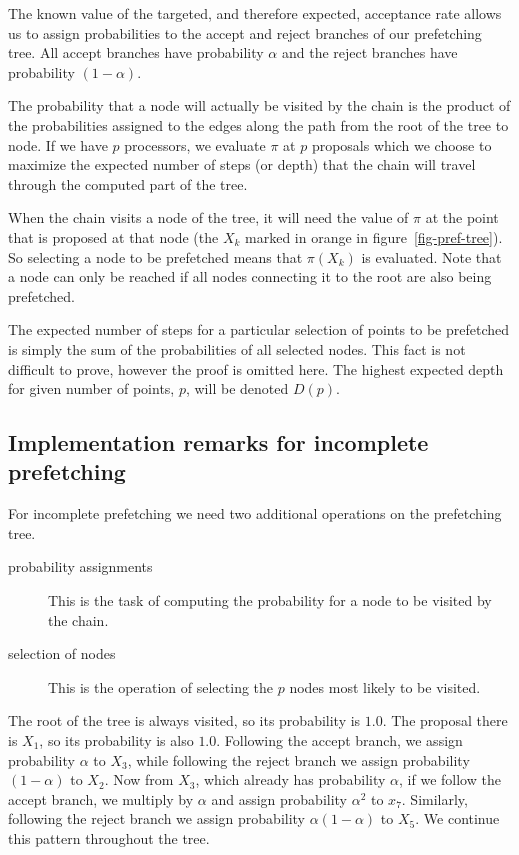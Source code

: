 \documentclass[11pt,letterpaper]{article}       %
\begin{document}
The known value of the targeted, and therefore expected, acceptance rate
allows us to assign probabilities to the accept and reject branches of our
prefetching tree.  All accept branches have probability $\alpha$ and 
the reject branches have probability $(1-\alpha)$.

The probability that a node will actually be visited by 
the chain is the product of the probabilities assigned to the edges along the 
path from the root of the tree to node.  If we have $p$ processors, we  
evaluate $\pi$ at $p$ proposals which we choose to maximize the expected 
number of steps (or depth) that the chain will travel through the computed 
part of the tree.  

When the chain visits a node of the 
tree, it will need the value of $\pi$ at the point that is proposed at that 
node (the $X_k$ marked in orange in figure~\ref{fig-pref-tree}).  So 
selecting a node to be 
prefetched means that $\pi(X_k)$ is evaluated.  
Note that a node can only be reached if all 
nodes connecting it to the root are also being prefetched. 

The expected number of steps for a particular selection of points to be 
prefetched is simply the sum of the probabilities of all selected 
nodes.  This fact is not difficult to prove, however the proof is omitted here. 
The highest expected depth for given number of points, $p$, will be denoted $D(p)$.

\subsection{Implementation remarks for incomplete prefetching}

For incomplete prefetching we need two additional operations on the prefetching 
tree.  
\begin{description}
\item[probability assignments] This is the task of computing the 
probability for a node to be visited by the chain.
\item[selection of nodes] This is the operation of selecting the 
$p$ nodes most likely to be visited.
\end{description}

The root of the tree is always visited, so its probability is $1.0$.  The 
proposal there is $X_1$, so its probability is also $1.0$.  Following the 
accept branch, we assign probability $\alpha$ to $X_3$, while following 
the reject branch we assign probability $(1-\alpha)$ to $X_2$.  Now from 
$X_3$, which already has probability $\alpha$, if we follow the 
accept branch, we multiply by $\alpha$ and assign probability $\alpha^2$ to 
$x_7$.  Similarly, following the reject branch we assign probability 
$\alpha(1-\alpha)$ to $X_5$. We continue this pattern throughout the tree. 
\end{document}
